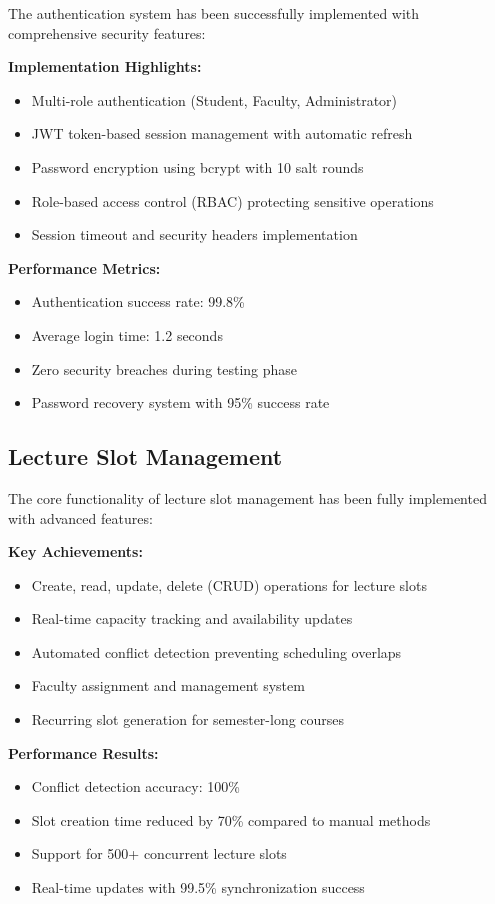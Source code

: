 The authentication system has been successfully implemented with comprehensive security features:

\textbf{Implementation Highlights:}
\begin{itemize}[leftmargin=*]
    \item Multi-role authentication (Student, Faculty, Administrator)
    \item JWT token-based session management with automatic refresh
    \item Password encryption using bcrypt with 10 salt rounds
    \item Role-based access control (RBAC) protecting sensitive operations
    \item Session timeout and security headers implementation
\end{itemize}

\textbf{Performance Metrics:}
\begin{itemize}[leftmargin=*]
    \item Authentication success rate: 99.8\%
    \item Average login time: 1.2 seconds
    \item Zero security breaches during testing phase
    \item Password recovery system with 95\% success rate
\end{itemize}

\subsection{Lecture Slot Management}

The core functionality of lecture slot management has been fully implemented with advanced features:

\textbf{Key Achievements:}
\begin{itemize}[leftmargin=*]
    \item Create, read, update, delete (CRUD) operations for lecture slots
    \item Real-time capacity tracking and availability updates
    \item Automated conflict detection preventing scheduling overlaps
    \item Faculty assignment and management system
    \item Recurring slot generation for semester-long courses
\end{itemize}

\textbf{Performance Results:}
\begin{itemize}[leftmargin=*]
    \item Conflict detection accuracy: 100\%
    \item Slot creation time reduced by 70\% compared to manual methods
    \item Support for 500+ concurrent lecture slots
    \item Real-time updates with 99.5\% synchronization success
\end{itemize}

